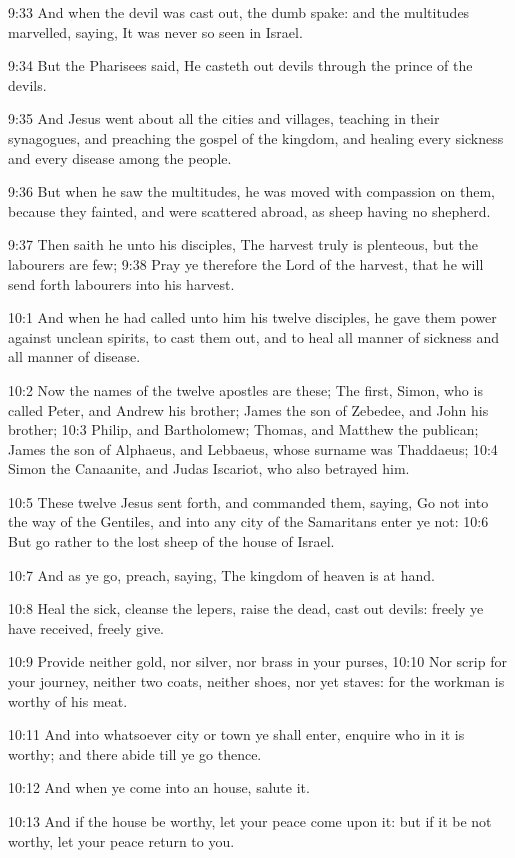 9:33 And when the devil was cast out, the dumb spake: and the multitudes marvelled, saying, It was never so seen in Israel.

9:34 But the Pharisees said, He casteth out devils through the prince of the devils.

9:35 And Jesus went about all the cities and villages, teaching in their synagogues, and preaching the gospel of the kingdom, and healing every sickness and every disease among the people.

9:36 But when he saw the multitudes, he was moved with compassion on them, because they fainted, and were scattered abroad, as sheep having no shepherd.

9:37 Then saith he unto his disciples, The harvest truly is plenteous, but the labourers are few; 9:38 Pray ye therefore the Lord of the harvest, that he will send forth labourers into his harvest.

10:1 And when he had called unto him his twelve disciples, he gave them power against unclean spirits, to cast them out, and to heal all manner of sickness and all manner of disease.

10:2 Now the names of the twelve apostles are these; The first, Simon, who is called Peter, and Andrew his brother; James the son of Zebedee, and John his brother; 10:3 Philip, and Bartholomew; Thomas, and Matthew the publican; James the son of Alphaeus, and Lebbaeus, whose surname was Thaddaeus; 10:4 Simon the Canaanite, and Judas Iscariot, who also betrayed him.

10:5 These twelve Jesus sent forth, and commanded them, saying, Go not into the way of the Gentiles, and into any city of the Samaritans enter ye not: 10:6 But go rather to the lost sheep of the house of Israel.

10:7 And as ye go, preach, saying, The kingdom of heaven is at hand.

10:8 Heal the sick, cleanse the lepers, raise the dead, cast out devils: freely ye have received, freely give.

10:9 Provide neither gold, nor silver, nor brass in your purses, 10:10 Nor scrip for your journey, neither two coats, neither shoes, nor yet staves: for the workman is worthy of his meat.

10:11 And into whatsoever city or town ye shall enter, enquire who in it is worthy; and there abide till ye go thence.

10:12 And when ye come into an house, salute it.

10:13 And if the house be worthy, let your peace come upon it: but if it be not worthy, let your peace return to you.


